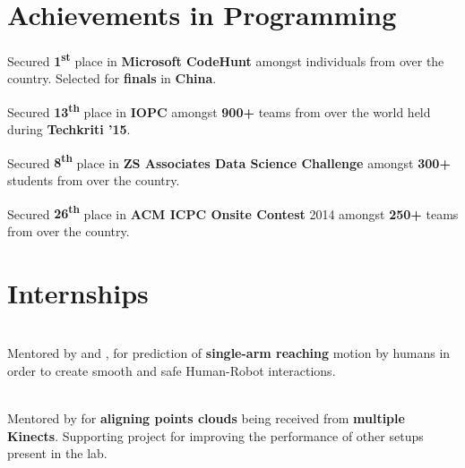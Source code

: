 \documentclass[a4paper]{norm-resume}
\begin{document}
\vspace{0mm}	%


\section{Achievements in Programming \hrulefill}

\vspace{3mm} %

\begin{tightitemize}
	\item Secured \textbf{1\textsuperscript{st}} place in \textbf{Microsoft CodeHunt} amongst individuals from over the country. Selected for \textbf{finals} in \textbf{China}.
	\item Secured \textbf{13\textsuperscript{th}} place in \textbf{IOPC} amongst \textbf{900+} teams from over the world held during \textbf{Techkriti '15}.
	\item Secured \textbf{8\textsuperscript{th}} place in \textbf{ZS Associates Data Science Challenge} amongst \textbf{300+} students from over the country.
	\item Secured \textbf{26\textsuperscript{th}} place in \textbf{ACM ICPC Onsite Contest} 2014 amongst \textbf{250+} teams from over the country.
\end{tightitemize}

\vspace{1mm}	%


\section{Internships \hrulefill}
		
\vspace{2mm} %

 	
\location{}

\vspace{-3mm} %

	\begin{changemargin}{0.7cm}{0.0cm} 
	{
	\large{}  \\
	\small{Mentored by  and , for prediction of \textbf{single-arm reaching} motion by humans in order to create smooth and safe Human-Robot interactions.}

	\vspace{-1mm} %

	\large{} \\
	\small{Mentored by  for \textbf{aligning points clouds} being received from \textbf{multiple Kinects}. Supporting project for improving the performance of other setups present in the lab.}

	}
	\end{changemargin} 
			
\end{document}
